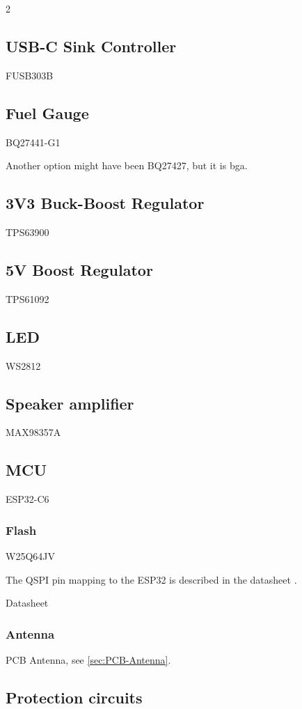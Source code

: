 \documentclass[11px]{specification}
\begin{document}
\begin{multicols}{2}

\subsection{USB-C Sink Controller}
FUSB303B

\subsection{Fuel Gauge}
BQ27441-G1

Another option might have been BQ27427, but it is bga.


\subsection{3V3 Buck-Boost Regulator}
TPS63900

\subsection{5V Boost Regulator}
TPS61092

\subsection{LED}
WS2812

\subsection{Speaker amplifier}
MAX98357A

\subsection{MCU}
ESP32-C6

\subsubsection{Flash}
W25Q64JV

The QSPI pin mapping to the ESP32 is described in the datasheet \cite[32]{esp32-c6-datasheet}.

Datasheet \cite{w25q64jv-datasheet}

\subsubsection{Antenna}
PCB Antenna, see \autoref{sec:PCB-Antenna}.
\subsection{Protection circuits}

\end{multicols}
\end{document}
